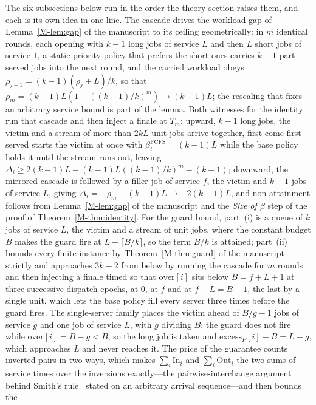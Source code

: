 \documentclass[mathematics,supfile,submit,moreauthors]{Definitions/mdpi}
\begin{document}
The six subsections below run in the order the theory section raises them, and each is
its own idea in one line. The cascade drives the workload gap of Lemma~\ref*{M-lem:gap} of the
manuscript to its ceiling geometrically: in $m$ identical rounds, each opening with
$k-1$ long jobs of service $L$ and then $L$ short jobs of service $1$, a static-priority
policy that prefers the short ones carries $k-1$ part-served jobs into the next round,
and the carried workload obeys $\rho_{j+1} = (k-1)(\rho_j + L)/k$, so that
$\rho_m = (k-1)L(1 - ((k-1)/k)^m) \to (k-1)L$; the rescaling that fixes an arbitrary
service bound is part of the lemma. Both witnesses for the identity run that cascade
and then inject a finale at $T_m$: upward, $k-1$ long jobs, the victim and a stream of
more than $2kL$ unit jobs arrive together, first-come first-served starts the victim at
once with $\beta^{\mathrm{FCFS}}_i = (k-1)L$ while the base policy holds it until the
stream runs out, leaving
$\Delta_i \ge 2(k-1)L - (k-1)L((k-1)/k)^m - (k-1)$; downward, the mirrored cascade is
followed by a filler job of service $f$, the victim and $k-1$ jobs of service $L$,
giving $\Delta_i = -\rho_m - (k-1)L \to -2(k-1)L$, and non-attainment follows from
Lemma~\ref*{M-lem:gap} of the manuscript and the \emph{Size of $\beta$} step of the proof of
Theorem~\ref*{M-thm:identity}.
For the guard bound, part~(i) is a queue of $k$ jobs of service $L$, the victim and a
stream of unit jobs, where the constant budget $B$ makes the guard fire at
$L + \lceil B/k \rceil$, so the term $B/k$ is attained; part~(ii) bounds every finite
instance by Theorem~\ref*{M-thm:guard} of the manuscript strictly and approaches $3k-2$ from below by
running the cascade for $m$ rounds and then injecting a finale timed so that
$\mathrm{over}[i]$ sits below $B = f + L + 1$ at three successive dispatch epochs, at
$0$, at $f$ and at $f + L = B - 1$, the last by a single unit, which lets the base
policy fill every server three times before the guard fires. The single-server family
places the victim ahead of $B/g - 1$ jobs of service $g$ and one job of service $L$,
with $g$ dividing $B$: the guard does not fire while $\mathrm{over}[i] = B - g < B$, so
the long job is taken and $\mathrm{excess}_P[i] - B = L - g$, which approaches $L$ and
never reaches it. The price of the guarantee counts inverted pairs in two ways, which
makes $\sum_i \mathrm{In}_i$ and $\sum_i \mathrm{Out}_i$ the two sums of service times
over the inversions exactly---the pairwise-interchange argument behind Smith's
rule~\cite{smith1956} stated on an arbitrary arrival sequence---and then bounds the
\end{document}
